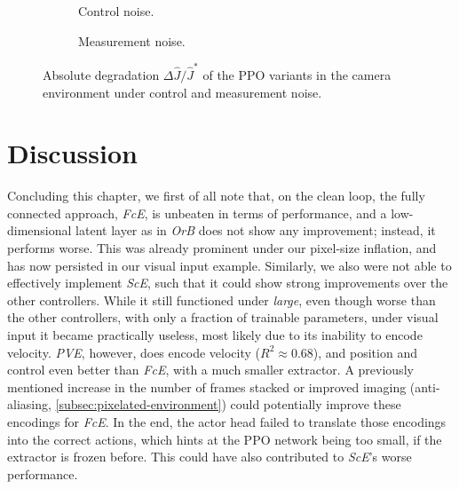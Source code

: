 \begin{figure}[htbp]
  \centering
  \begin{subfigure}[t]{0.49\linewidth}
    \centering
    \caption{Control noise.}
    \label{fig:perc-noise-control-absolute}
  \end{subfigure}\hfill
  \begin{subfigure}[t]{0.49\linewidth}
    \centering
    \caption{Measurement noise.}
    \label{fig:perc-noise-measurement-absolute}
  \end{subfigure}
  \caption{Absolute degradation $\Delta \hat{J} / \hat{J}^{*}$ of the PPO variants in the camera environment under control and measurement noise.}
  \label{fig:perc-noise-control-measurement}
\end{figure}

\section{Discussion}
\label{sec:perception-discussion}

Concluding this chapter, we first of all note that, on the clean loop, the fully connected approach, \emph{FcE},
is unbeaten in terms of performance, and a low-dimensional latent layer as in \emph{OrB} does not show any improvement;
instead, it performs worse. This was already prominent under our pixel-size inflation, and has now
persisted in our visual input example. Similarly, we also were not able to effectively implement \emph{ScE}, such that
it could show strong improvements over the other controllers. While it still functioned under \emph{large}, even though worse
than the other controllers, with only a fraction of trainable parameters, under visual input it became practically useless, most likely due to
its inability to encode velocity. \emph{PVE}, however, does encode velocity ($R^2 \approx 0.68$), and position and control
even better than \emph{FcE}, with a much smaller extractor. A previously mentioned increase in the number of frames stacked
or improved imaging (anti-aliasing, \cref{subsec:pixelated-environment}) could potentially improve these encodings for \emph{FcE}.
In the end, the actor head failed to translate those encodings into the correct actions,
which hints at the PPO network being too small, if the extractor is frozen before. This could have also contributed to
\emph{ScE}'s worse performance.

